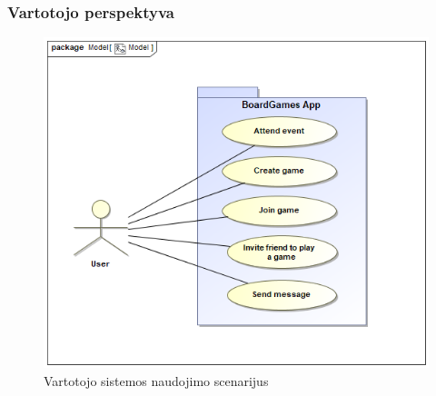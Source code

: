 \documentclass{VUMIFPSkursinis}
\begin{document}
		\subsubsection {Vartotojo perspektyva}
			\begin{figure}[H]
				\centering
				\includegraphics[scale=0.5]{img/UserUseCase}
				\caption{Vartotojo sistemos naudojimo scenarijus}
				\label{img:UserUseCase}
			\end{figure}
			
\end{document}

